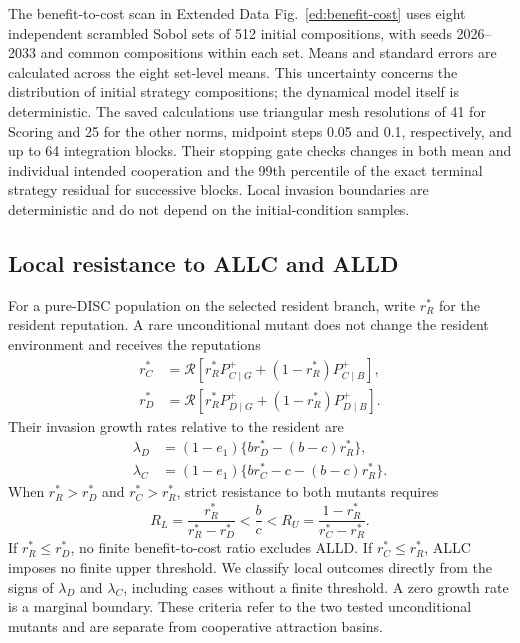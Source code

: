 \documentclass[fleqn,10pt]{article}
\begin{document}
The benefit-to-cost scan in Extended Data Fig.~\ref{ed:benefit-cost} uses eight independent scrambled Sobol sets of 512 initial compositions, with seeds 2026--2033 and common compositions within each set. Means and standard errors are calculated across the eight set-level means. This uncertainty concerns the distribution of initial strategy compositions; the dynamical model itself is deterministic. The saved calculations use triangular mesh resolutions of 41 for Scoring and 25 for the other norms, midpoint steps 0.05 and 0.1, respectively, and up to 64 integration blocks. Their stopping gate checks changes in both mean and individual intended cooperation and the 99th percentile of the exact terminal strategy residual for successive blocks. Local invasion boundaries are deterministic and do not depend on the initial-condition samples.

\subsection*{Local resistance to ALLC and ALLD}

For a pure-DISC population on the selected resident branch, write $r_R^*$ for the resident reputation. A rare unconditional mutant does not change the resident environment and receives the reputations
\begin{equation}
\begin{aligned}
r_C^*&=\mathcal R\!\left[r_R^*P^+_{C\mid G}+(1-r_R^*)P^+_{C\mid B}\right],\\
r_D^*&=\mathcal R\!\left[r_R^*P^+_{D\mid G}+(1-r_R^*)P^+_{D\mid B}\right].
\end{aligned}
\label{eq:methods-classical-mutants}
\end{equation}
Their invasion growth rates relative to the resident are
\begin{equation}
\begin{aligned}
\lambda_D&=(1-e_1)\{br_D^*-(b-c)r_R^*\},\\
\lambda_C&=(1-e_1)\{br_C^*-c-(b-c)r_R^*\}.
\end{aligned}
\label{eq:methods-classical-invasion}
\end{equation}
When $r_R^*>r_D^*$ and $r_C^*>r_R^*$, strict resistance to both mutants requires
\begin{equation}
R_L=\frac{r_R^*}{r_R^*-r_D^*}<\frac bc<
R_U=\frac{1-r_R^*}{r_C^*-r_R^*}.
\label{eq:methods-classical-thresholds}
\end{equation}
If $r_R^*\leq r_D^*$, no finite benefit-to-cost ratio excludes ALLD. If $r_C^*\leq r_R^*$, ALLC imposes no finite upper threshold. We classify local outcomes directly from the signs of $\lambda_D$ and $\lambda_C$, including cases without a finite threshold. A zero growth rate is a marginal boundary. These criteria refer to the two tested unconditional mutants and are separate from cooperative attraction basins.
\end{document}
